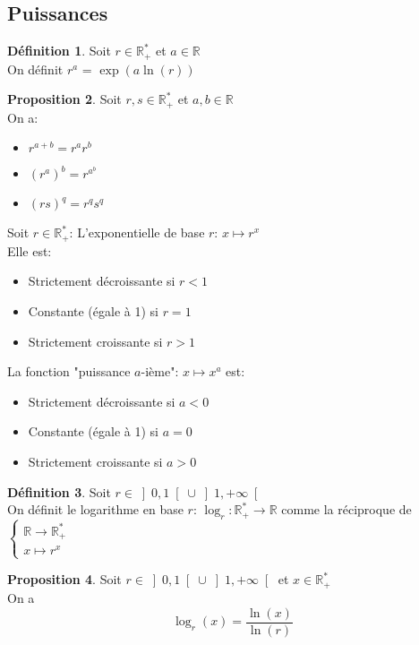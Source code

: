 \documentclass[10pt,a4paper]{article}
\theoremstyle{definition}
\newtheorem{proposition}{Proposition}[section]
\newtheorem{definition}[proposition]{Définition}
\begin{document}
\pagebreak

\subsection{Puissances}
\begin{definition}
Soit $r \in \mathbb{R}_+^*$ et $a \in \mathbb{R}$ \\
On définit $r^a$ = $\exp(a \ln(r))$
\end{definition}
\begin{proposition}
Soit $r, s \in \mathbb{R}_+^*$ et $a, b \in \mathbb{R}$ \\
On a:
\begin{itemize}
\item $r^{a + b} = r^a r^b$
\item $\left(r^a\right)^b = r^{a^b}$
\item $\left(rs\right)^q = r^q s^q$
\end{itemize}
Soit $r \in \mathbb{R}_+^*$: L'exponentielle de base $r$: $x \mapsto r^x$ \\
Elle est:
\begin{itemize}
\item Strictement décroissante si $r < 1$
\item Constante (égale à 1) si $r = 1$
\item Strictement croissante si $r > 1$
\end{itemize}
La fonction "puissance $a$-ième": $x \mapsto x^a$ est:
\begin{itemize}
\item Strictement décroissante si $a < 0$
\item Constante (égale à 1) si $a = 0$
\item Strictement croissante si $a > 0$
\end{itemize}
\end{proposition}
\begin{definition}
Soit $r \in \left] 0, 1 \right[ \cup \left] 1, +\infty \right[$ \\
On définit le logarithme en base $r$: $\log_r : \mathbb{R}_+^* \to \mathbb{R}$ comme la réciproque de $\begin{cases}
\mathbb{R} \to \mathbb{R}_+^* \\
x \mapsto r^x
\end{cases}$
\end{definition}
\begin{proposition}
Soit $r \in \left] 0, 1 \right[ \cup \left] 1, +\infty \right[$ et $x \in \mathbb{R}_+^*$ \\
On a
\[ \log_r(x) = \frac{\ln(x)}{\ln(r)} \]
\end{proposition}
\end{document}
